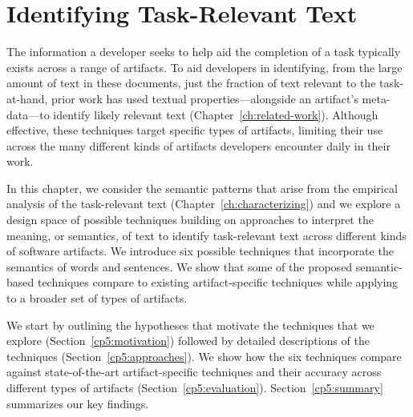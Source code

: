 \setcounter{chapter}{4}


\chapter{Identifying Task-Relevant Text}
\label{ch:identifying}

The information a developer seeks to help aid the completion of a task typically exists
across a range of artifacts. 
To aid developers in identifying, from the large amount of text
in these documents, just the fraction of text relevant
to the task-at-hand, prior work has used textual properties---alongside an artifact's meta-data---to
 identify likely relevant text (Chapter~\ref{ch:related-work}).
Although effective, these techniques target specific
types of artifacts, limiting their use across the 
many different kinds of artifacts developers encounter
daily in their work.



In this chapter, we consider the 
semantic patterns that arise from the empirical analysis of the task-relevant text (Chapter~\ref{ch:characterizing})
and we explore a design space of possible techniques building on approaches to interpret the meaning, or semantics, of text
to identify task-relevant text across different kinds of software artifacts.
We introduce six possible techniques that incorporate the  
semantics of words and sentences. 
We show that some of the proposed semantic-based techniques 
compare to existing artifact-specific techniques 
while applying to a broader set of types of artifacts.





We start by outlining the hypotheses that motivate the techniques that we explore (Section~\ref{cp5:motivation}) followed by detailed descriptions of the
techniques (Section~\ref{cp5:approaches}).
We show how the six techniques 
compare against state-of-the-art artifact-specific techniques and 
their accuracy across different types of artifacts (Section~\ref{cp5:evaluation}). 
Section~\ref{cp5:summary} summarizes our key findings.











